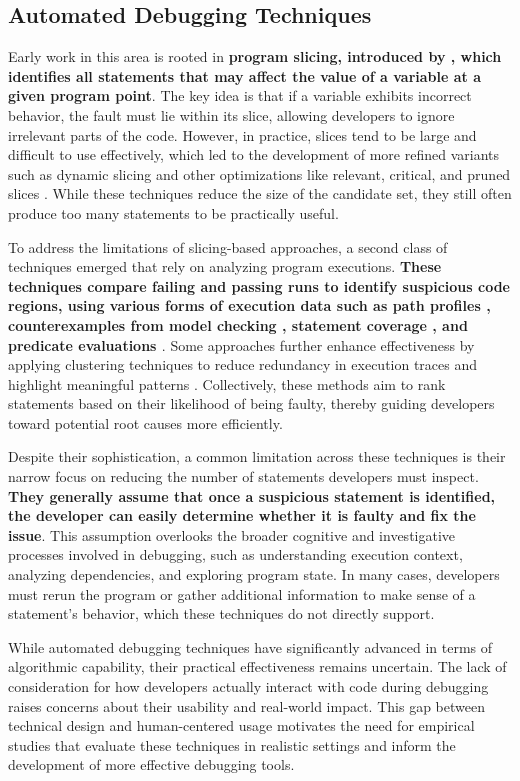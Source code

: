 \subsection{Automated Debugging Techniques}
Early work in this area is rooted in \textbf{program slicing, introduced by \cite{Weiser1981,Weiser1984}, which identifies all statements that may affect the value of a variable at a given program point}. The key idea is that if a variable exhibits incorrect behavior, the fault must lie within its slice, allowing developers to ignore irrelevant parts of the code. However, in practice, slices tend to be large and difficult to use effectively, which led to the development of more refined variants such as dynamic slicing \cite{Korel1988} and other optimizations like relevant, critical, and pruned slices \cite{Gyimothy1999,Zhang2006}. While these techniques reduce the size of the candidate set, they still often produce too many statements to be practically useful.

To address the limitations of slicing-based approaches, a second class of techniques emerged that rely on analyzing program executions. \textbf{These techniques compare failing and passing runs to identify suspicious code regions, using various forms of execution data such as path profiles \cite{Reps1997}, counterexamples from model checking \cite{Ball2003,Groce2004}, statement coverage \cite{Jones2002}, and predicate evaluations \cite{Liblit2005}}. Some approaches further enhance effectiveness by applying clustering techniques to reduce redundancy in execution traces and highlight meaningful patterns \cite{Renieris2003,Liu2006,Hao2005}. Collectively, these methods aim to rank statements based on their likelihood of being faulty, thereby guiding developers toward potential root causes more efficiently.

Despite their sophistication, a common limitation across these techniques is their narrow focus on reducing the number of statements developers must inspect. \textbf{They generally assume that once a suspicious statement is identified, the developer can easily determine whether it is faulty and fix the issue}. This assumption overlooks the broader cognitive and investigative processes involved in debugging, such as understanding execution context, analyzing dependencies, and exploring program state. In many cases, developers must rerun the program or gather additional information to make sense of a statement's behavior, which these techniques do not directly support.

While automated debugging techniques have significantly advanced in terms of algorithmic capability, their practical effectiveness remains uncertain. The lack of consideration for how developers actually interact with code during debugging raises concerns about their usability and real-world impact. This gap between technical design and human-centered usage motivates the need for empirical studies that evaluate these techniques in realistic settings and inform the development of more effective debugging tools.

